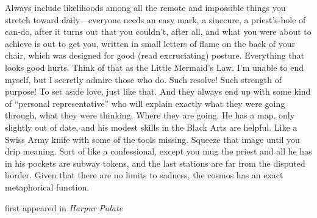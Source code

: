 Always include likelihoods among all the remote and impossible things
you stretch toward daily---everyone needs an easy mark, a sinecure, a
priest's-hole of can-do, after it turns out that you couldn't, after
all, and what you were about to achieve is out to get you, written in
small letters of flame on the back of your chair, which was designed for
good (read excruciating) posture. Everything that looks good hurts.
Think of that as the Little Mermaid's Law. I'm unable to end myself, but
I secretly admire those who do. Such resolve! Such strength of purpose!
To set aside love, just like that. And they always end up with some kind
of ``personal representative'' who will explain exactly what they were
going through, what they were thinking. Where they are going. He has a
map, only slightly out of date, and his modest skills in the Black Arts
are helpful. Like a Swiss Army knife with some of the tools missing.
Squeeze that image until you drip meaning. Sort of like a confessional,
except you mug the priest and all he has in his pockets are subway
tokens, and the last stations are far from the disputed border. Given
that there are no limits to sadness, the cosmos has an exact
metaphorical function.

first appeared in \emph{Harpur Palate}
